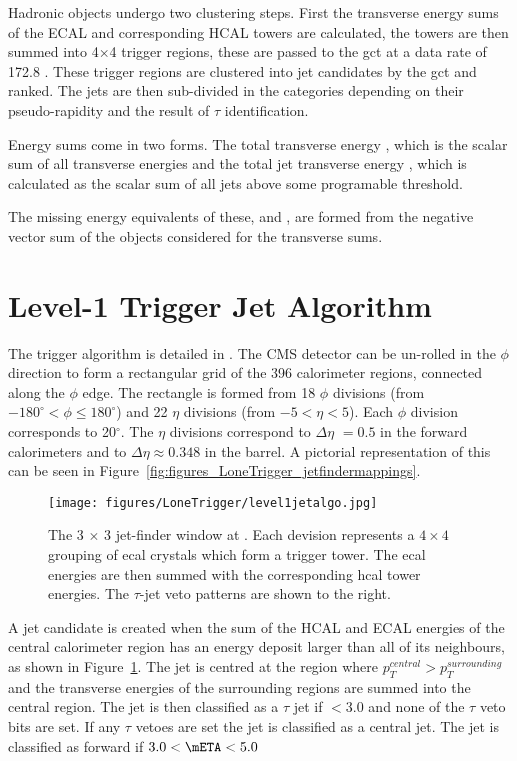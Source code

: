 Hadronic objects undergo two clustering steps. First the transverse energy 
sums of the ECAL and corresponding HCAL towers are calculated, the towers are 
then summed into 4$\times$4 trigger regions, these  are passed to the \ac{gct} at a 
data rate of 172.8 \Gbs. These trigger regions are clustered into jet 
candidates by the \ac{gct} and ranked. The jets are then sub-divided in the 
categories depending on their pseudo-rapidity and the result of $\tau$ 
identification. 

Energy sums come in two forms. The total transverse energy \ET, which is the 
scalar sum of all transverse energies and the total jet transverse energy \HT,
which is calculated as the scalar sum of all jets above some programable 
threshold.

The missing energy equivalents of these, \MET and \MHT, are formed from the 
negative vector sum of the objects considered for the transverse sums.



\section{Level-1 Trigger Jet Algorithm} %
\label{sec:leve_1_trigger_jet_algorithm}
The \Lone trigger algorithm is detailed in .
The CMS detector can be un-rolled in the $\phi$ direction to form a rectangular 
grid of the 396 calorimeter regions, connected along the $\phi$ edge. The
rectangle is formed from 18 $\phi$ divisions (from $-180^{\circ} < \phi \leq 
180^{\circ}$) and 22 $\eta$ divisions (from $-5 < \eta < 5$). Each $\phi$ 
division corresponds to 20$^{\circ}$. The $\eta$ divisions correspond to 
$\Delta\eta$ $= 0.5$ in the forward calorimeters and to $\Delta\eta \approx 
0.348$ in the barrel. A pictorial representation of this can be seen in 
Figure~\ref{fig:figures_LoneTrigger_jetfindermappings}.

\begin{figure}[ht]
  \centering
    \texttt{[image: figures/LoneTrigger/level1jetalgo.jpg]}
  \caption{The 3 $\times$ 3 jet-finder window at \Lone. Each devision represents a $4\times4$ grouping of \ac{ecal} crystals which form a trigger tower. The \ac{ecal} energies are then summed with the corresponding \ac{hcal} tower energies. The $\tau$-jet veto patterns are shown to the right.}
  \label{fig:figures_LoneTrigger_level1jetalgo}
\end{figure}


A jet candidate is created when the sum of the HCAL and ECAL energies of the 
central calorimeter region has an energy deposit larger than all of its 
neighbours, as shown in Figure~\ref{fig:figures_LoneTrigger_level1jetalgo}.
The jet is centred at the region where $p_{T}^{central} > p_{T}^{surrounding}$
and the transverse energies of the surrounding regions are summed into the 
central region. The jet is then classified as a $\tau$ jet if \mETA $< 3.0$ and 
none of the $\tau$ veto bits are set. If any $\tau$ vetoes are set the jet is 
classified as a central jet. The jet is classified as forward if $ 3.0 < \mETA 
< 5.0$

